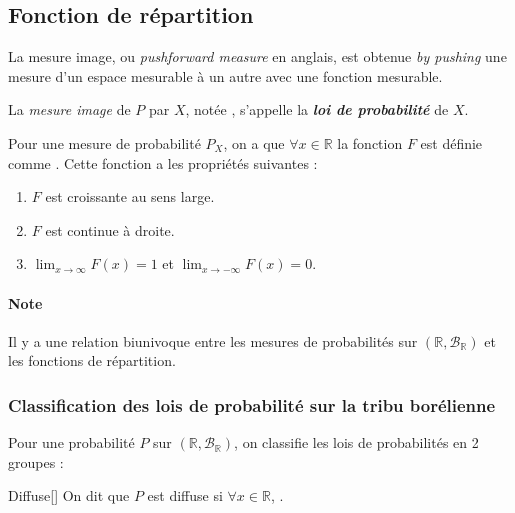 \documentclass[10pt, french]{article}
\begin{document}
\begin{multicols*}{2}
\columnbreak
\subsection{Fonction de répartition}
\begin{definitionNOHFILL}
La mesure image, ou \og \textit{pushforward measure} \fg{} en anglais, est obtenue \og \textit{by pushing} \fg{} une mesure d'un espace mesurable à un autre avec une fonction mesurable.
\end{definitionNOHFILL}

\begin{definitionNOHFILL}
La \textit{mesure image} de $P$ par $X$, notée , s'appelle la \textbf{\textit{loi de probabilité}} de $X$.
\end{definitionNOHFILL}

\begin{definitionNOHFILLsub}
Pour une mesure de probabilité $P_{X}$, on a que $\forall x \in \mathbb{R}$ la fonction $F$ est définie comme \lfbox[formula]{$F(x) = P_{X}(]-\infty, x])$}. Cette fonction a les propriétés suivantes : 
\begin{enumerate}[label = \circled{\arabic*}{trueblue}]
	\item	$F$ est croissante au sens large.
	\item	$F$ est continue à droite.
	\item	$\lim_{x \rightarrow \infty} F(x) = 1$ et $\lim_{x \rightarrow -\infty} F(x) = 0$.
\end{enumerate}
\end{definitionNOHFILLsub}

\paragraph{Note}	Il y a une relation biunivoque entre les mesures de probabilités sur $(\mathbb{R}, \mathcal{B}_{\mathbb{R}})$ et les fonctions de répartition.

\bigskip

\subsubsection{Classification des lois de probabilité sur la tribu borélienne}
Pour une probabilité $P$ sur $(\mathbb{R}, \mathcal{B}_{\mathbb{R}})$, on classifie les lois de probabilités en 2 groupes :
\begin{definitionGENERAL}{Diffuse}[]
On dit que $P$ est diffuse si $\forall x \in \mathbb{R}$, .
\end{definitionGENERAL}


\end{multicols*}
\end{document}
